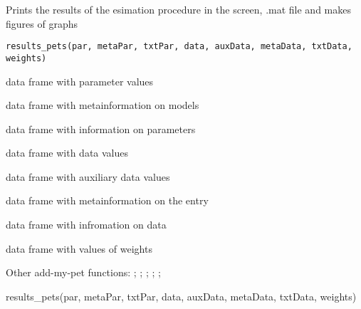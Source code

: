 \documentclass[a4paper]{book}
\begin{document}
%
\begin{Description}\relax
Prints the results of the esimation procedure in the screen, .mat file and makes figures of graphs
\end{Description}
%
\begin{Usage}
\begin{verbatim}
results_pets(par, metaPar, txtPar, data, auxData, metaData, txtData, weights)
\end{verbatim}
\end{Usage}
%
\begin{Arguments}
\begin{ldescription}
\item[\code{par}] data frame with parameter values

\item[\code{metaPar}] data frame with metainformation on models

\item[\code{txtPar}] data frame with information on parameters

\item[\code{data}] data frame with data values

\item[\code{auxData}] data frame with auxiliary data values

\item[\code{metaData}] data frame with metainformation on the entry

\item[\code{txtData}] data frame with infromation on data

\item[\code{weights}] data frame with values of weights
\end{ldescription}
\end{Arguments}
%
\begin{SeeAlso}\relax
Other add-my-pet functions: ;
; ;
; ;
\end{SeeAlso}
%
\begin{Examples}
\begin{ExampleCode}
results_pets(par, metaPar, txtPar, data, auxData, metaData, txtData, weights)
\end{ExampleCode}
\end{Examples}
\end{document}
